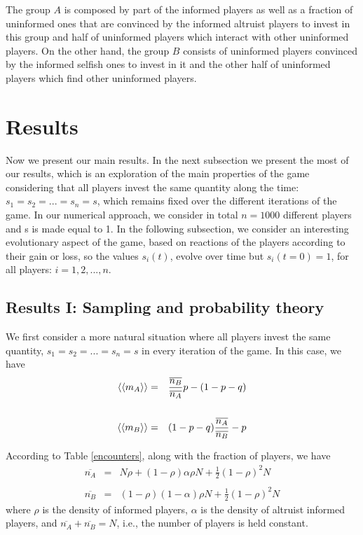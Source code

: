 \documentclass[3p, 11pt]{elsarticle}
\begin{document}
The group $A$ is composed by part of the informed players as well as a
fraction of uninformed ones that are convinced by the informed altruist
players to invest in this group and half of uninformed players which
interact with other uninformed players. On the other hand, the group $B$
consists of uninformed players convinced by the informed selfish ones to
invest in it and the other half of uninformed players which find other
uninformed players.

\section{Results}

\label{Sec:Results}

Now we present our main results. In the next subsection we present the most
of our results, which is an exploration of the main properties of the game
considering that all players invest the same quantity along the time: $%
s_{1}=s_{2}=...=s_{n}=s$, which remains fixed over the different iterations
of the game. In our numerical approach, we consider in total $n=1000$
different players and s is made equal to 1. In the following subsection, we
consider an interesting evolutionary aspect of the game, based on reactions
of the players according to their gain or loss, so the values $s_{i}(t)$,
evolve over time but $s_{i}(t=0)=1$, for all players: $i=1,2,...,n$.

\subsection{Results I: Sampling and probability theory}

We first consider a more natural situation where all players invest the same
quantity, $s_{1}=s_{2}=...=s_{n}=s$ in every iteration of the game. In this
case, we have 
\begin{eqnarray*}
\left\langle \left\langle m_{A}\right\rangle \right\rangle &=&\frac{%
\overline{n_{B}}}{\overline{n_{A}}}p-(1-p-q) \\
&& \\
\left\langle \left\langle m_{B}\right\rangle \right\rangle &=&(1-p-q)\frac{%
\overline{n_{A}}}{\overline{n_{B}}}-p
\end{eqnarray*}

According to Table \ref{encounters}, along with the fraction of players, we
have 
\begin{eqnarray*}
\overline{n_{A}} &=&N\rho +(1-\rho )\alpha \rho N+\frac{1}{2}(1-\rho )^{2}N
\\
&& \\
\overline{n_{B}} &=&(1-\rho )(1-\alpha )\rho N+\frac{1}{2}(1-\rho )^{2}N
\end{eqnarray*}%
where $\rho $ is the density of informed players, $\alpha $ is the density
of altruist informed players, and $\overline{n_{A}}+\overline{n_{B}}=N$,
i.e., the number of players is held constant.
\end{document}
